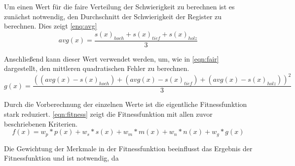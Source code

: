 Um einen Wert für die faire Verteilung der Schwierigkeit zu berechnen ist es zunächst notwendig, den Durchschnitt der
Schwierigkeit der Register zu berechnen. Dies zeigt \autoref{enq:avg}
\begin{equation}
    avg(x) = \frac{s(x)_{hoch} + s(x)_{tief} + s(x)_{holz}}{3}
    \label{enq:avg}
\end{equation}

Anschließend kann dieser Wert verwendet werden, um, wie in \autoref{eqn:fair} dargestellt,
den mittleren quadratischen Fehler zu berechnen.
\begin{equation}
    g(x) = \frac{((avg(x) - s(x)_{hoch}) + (avg(x) - s(x)_{tief}) +(avg(x) - s(x)_{holz}))^2}{3}
    \label{eqn:fair}
\end{equation}



Durch die Vorberechnung der einzelnen Werte ist die eigentliche Fitnessfunktion stark reduziert.
\autoref{eqn:fitness} zeigt die Fitnessfunktion mit allen zuvor beschriebenen Kriterien.
\begin{equation}
    f(x) = w_p * p(x) + w_s * s(x) + w_m * m(x) + w_n * n(x) +  w_g * g(x)
    \label{eqn:fitness}
\end{equation}



Die Gewichtung der Merkmale in der Fitnessfunktion beeinflusst das Ergebnis der Fitnessfunktion und
ist notwendig, da 